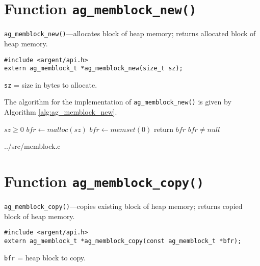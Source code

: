 %

\section{Function \texttt{ag\_memblock\_new()}}

\begin{noteblock}
\small
\verb|ag_memblock_new()|---allocates block of heap memory; returns allocated
block of heap memory.
\lstset{style=SYNOPSIS}
\begin{lstlisting}[linewidth=1.0\linewidth]
#include <argent/api.h>
extern ag_memblock_t *ag_memblock_new(size_t sz);
\end{lstlisting}
\verb|sz| = size in bytes to allocate.
\end{noteblock}

The algorithm for the implementation of \verb|ag_memblock_new()| is given by
Algorithm \ref{alg:ag_memblock_new}.

\begin{algorithm}
\scriptsize
\caption{\texttt{ag\_memblock\_new()}}
\label{alg:ag_memblock_new}
\begin{algorithmic}
\Require $sz \geq 0$
\State $bfr \gets malloc(sz)$
\State $bfr \gets memset(0)$
\State return $bfr$
\EndProcedure
\Ensure $bfr \neq null$
\end{algorithmic}
\end{algorithm}

\lstset{style=CODE}

  {../src/memblock.c}

%


\section{Function \texttt{ag\_memblock\_copy()}}

\begin{noteblock}
\small
\verb|ag_memblock_copy()|---copies existing block of heap memory; returns copied
block of heap memory.
\lstset{style=SYNOPSIS}
\begin{lstlisting}[linewidth=1.0\linewidth]
#include <argent/api.h>
extern ag_memblock_t *ag_memblock_copy(const ag_memblock_t *bfr);
\end{lstlisting}
\verb|bfr| = heap block to copy.
\end{noteblock}

